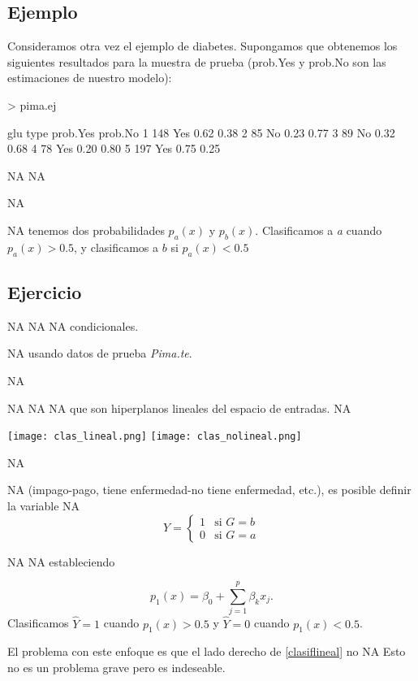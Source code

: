 \documentclass[nohyper]{tufte-handout}
\begin{document}
\subsection{Ejemplo}
Consideramos otra vez el ejemplo de diabetes. Supongamos
que obtenemos los siguientes resultados para la muestra de prueba
(prob.Yes y prob.No son las estimaciones de nuestro modelo):
\begin{Schunk}
\begin{Sinput}
> pima.ej
\end{Sinput}
\begin{Soutput}
  glu type prob.Yes prob.No
1 148  Yes     0.62    0.38
2  85   No     0.23    0.77
3  89   No     0.32    0.68
4  78  Yes     0.20    0.80
5 197  Yes     0.75    0.25
\end{Soutput}
\end{Schunk}
NA
NA


NA

NA
tenemos dos probabilidades $p_a(x)$ y $p_b(x)$. Clasificamos a {\em a}
cuando $p_a(x)>0.5$, y clasificamos a $b$ si $p_a(x) < 0.5$


\subsection{Ejercicio}
NA
NA
NA
condicionales. 

NA
usando datos de prueba {\em Pima.te}. 





NA

NA
NA
NA
que son hiperplanos lineales del espacio de entradas. 
NA


\texttt{[image: clas\_lineal.png]}
\texttt{[image: clas\_nolineal.png]}

NA

NA
(impago-pago, tiene enfermedad-no tiene enfermedad, etc.), es posible definir la variable
NA
$$Y=\begin{cases}
1 & \mbox{si } G=b\\
0 & \mbox{si } G=a
\end{cases}
$$

NA
NA
estableciendo

\begin{equation}\label{clasiflineal}
p_1(x)=\beta_0 + \sum_{j=1}^p \beta_kx_j.
\end{equation}
Clasificamos $\hat{Y}=1$ cuando $p_1(x)>0.5$ y $\hat{Y}=0$ cuando
 $p_1(x)<0.5$.
 
 El problema con este enfoque es que el lado derecho de \ref{clasiflineal} no
NA
 Esto no es un problema grave pero es indeseable. 
 
\end{document}
